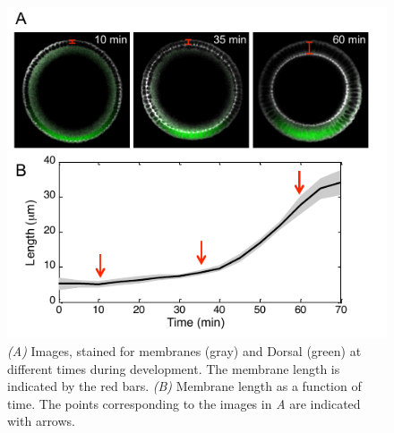 \documentclass{pnastwo}
\begin{document}
\begin{figure}
\includegraphics{figS2}
\caption{{\it (A)} Images, stained for membranes (gray) and Dorsal (green) at different times during development. The membrane length is indicated by the red bars. {\it (B)} Membrane length as a function of time. The points corresponding to the images in {\it A} are indicated with arrows.}
\label{fig:membrane_compare}
\end{figure}
\end{document}
